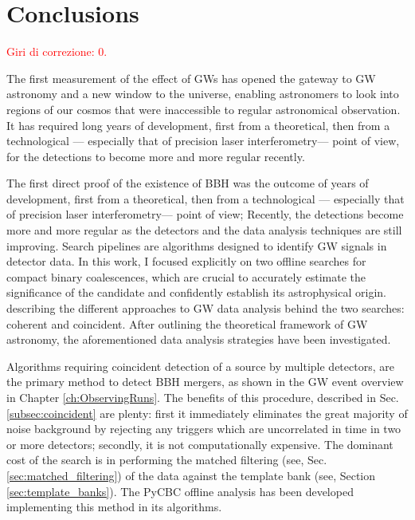 \documentclass[binding=0.6cm, LaM]{sapthesis}
\newcommand{\fpg}[1]{\textcolor{red}{#1} }
\begin{document}
\chapter*{Conclusions}

\fpg{Giri di correzione: 0.}%

	The first measurement of the effect of GWs has opened the gateway to GW astronomy 
	and a new window to the universe, enabling astronomers to look into regions of our cosmos 
	that were inaccessible to regular astronomical observation.
	It has required long years of development, first from a theoretical, 
	then from a technological — especially that of precision laser interferometry— point of view,
	for the detections to become more and more regular recently.
	
	The first direct proof of the existence of BBH was the outcome of years of development, 
	first from a theoretical, then from a technological — especially that of precision laser interferometry— point of view;
	Recently, the detections become more and more regular as the detectors and the data analysis techniques are still improving.
	Search pipelines are algorithms designed to identify GW signals in detector data.
	In this work, I focused explicitly on two offline searches for compact binary coalescences, 
	which are crucial to accurately estimate the significance of the candidate and confidently establish its astrophysical origin.
	describing the different approaches to GW data analysis behind the two searches: coherent and coincident.
	After outlining the theoretical framework of GW astronomy,
        the aforementioned data analysis strategies have been investigated.

	Algorithms requiring coincident detection of a source by multiple detectors,
        are the primary method to detect BBH mergers,
        as shown in the GW event overview in Chapter \ref{ch:ObservingRuns}.
        The benefits of this procedure, described in Sec.\ref{subsec:coincident} are plenty:
        first it immediately eliminates the great majority of noise background
        by rejecting any triggers which are uncorrelated in time in two or more detectors;
        secondly, it is not computationally expensive.
        The dominant cost of the search is in performing the matched filtering (see, Sec.\ref{sec:matched_filtering})
        of the data against the template bank (see, Section \ref{sec:template_banks}).
        The {\ttfamily PyCBC} offline analysis has been developed implementing this method in its algorithms.
\end{document}
